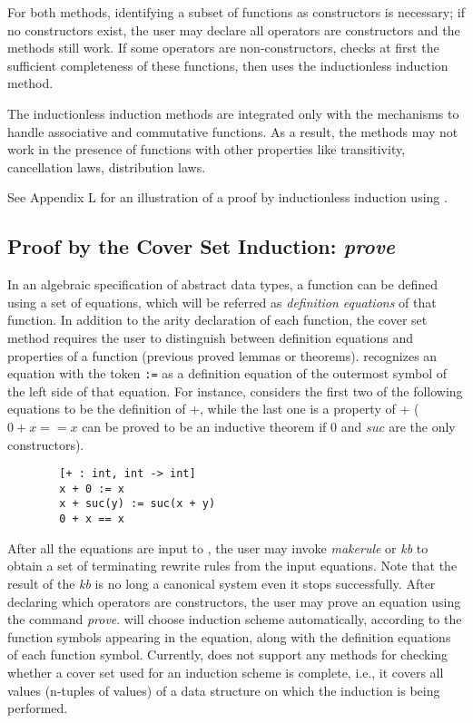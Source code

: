 For both methods,
identifying a subset of functions as constructors is
necessary; 
if no constructors exist, the user may declare all operators 
are constructors and the methods still work. 
If some operators are non-constructors,
\RRL checks at first
the sufficient completeness of these functions, then uses
the inductionless induction method.

The inductionless induction methods are 
integrated only with the mechanisms to handle
associative and commutative functions. As a result, the methods
may not work in the presence of
functions with other properties like transitivity, cancellation laws,
distribution laws.
  
See Appendix L for an illustration of a proof by inductionless
induction using \ERRL.

\subsection{Proof by the Cover Set Induction: \em prove}

In an algebraic specification of abstract data types,
a function can be defined using a set of equations, which will be referred
as {\em definition equations} of that function.
In addition to the arity declaration of each function,
the cover set method requires the user to distinguish between
definition equations and properties of a function
(previous proved lemmas or theorems).
\RRL recognizes an equation with the token {\tt :=} as a definition
equation of the outermost symbol of the left side of that equation.
For instance, \RRL considers the first two of the following equations
to be the definition of $+$, while the last one is a property of $+$
($0 + x == x$ can be proved to be an inductive theorem if 
0 and $suc$ are the only constructors).
\begin{verbatim}
        [+ : int, int -> int]
        x + 0 := x
        x + suc(y) := suc(x + y)
        0 + x == x
\end{verbatim}
After all the equations are input to \ERRL, the user
may invoke {\em makerule} or {\em kb} to obtain a set of terminating
rewrite rules from the input equations. Note that the result of
the {\em kb} is no long a canonical system even it stops 
successfully. After declaring which operators are constructors,
the user may prove an equation using the command {\em prove}.
\RRL will choose induction scheme automatically, according
to the function symbols appearing in the equation, along with the
definition equations of each function symbol. Currently, \RRL does not
support any methods for checking whether a cover set used for an
induction scheme is complete, i.e., it covers all values (n-tuples of
values) of a data structure on which the induction is being performed.

